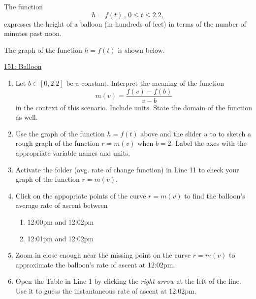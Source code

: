 \documentclass{ximera}
\begin{document}
\begin{question}  \label{Q4ghg5t4t4tr4}
The function
\[
      h = f(t)  \, , \, 0\leq t \leq 2.2 ,                     %
\]
expresses the height of a balloon (in hundreds of feet) in terms of the number of minutes past noon.

The graph of the function $h=f(t)$ is shown below.

\begin{onlineOnly}
    \begin{center}
\end{center}
\end{onlineOnly}

\href{https://www.desmos.com/calculator/yd4xm6x6ub}{151: Balloon}

\begin{enumerate}

\item Let $b\in [0,2.2]$ be a constant. Interpret the meaning of the function
\[
   m(v) =  \frac{f(v)-f(b)}{v-b}
\]
in the context of this scenario. Include units. State the domain of the function as well.

\item Use the graph of the function $h=f(t)$ above and the slider $u$ to to sketch a rough graph of the function $r=m(v)$ when $b=2$. Label the axes with the appropriate variable names and units.

\item Activate the folder (avg. rate of change function) in Line 11 to check your graph of the function $r=m(v)$. 

\item Click on the appopriate points of the curve $r=m(v)$ to find the balloon's average rate of ascent between 

\begin{enumerate}
\item 12:00pm and 12:02pm

\item 12:01pm and 12:02pm
\end{enumerate}

\item Zoom in close enough near the missing point on the curve $r=m(v)$ to approximate the balloon's rate of ascent at 12:02pm.

\item Open the Table in Line 1 by clicking the \emph{right arrow} at the left of the line. Use it to guess the instantaneous rate of ascent at 12:02pm.


\end{enumerate}
\end{question}
\end{document}
